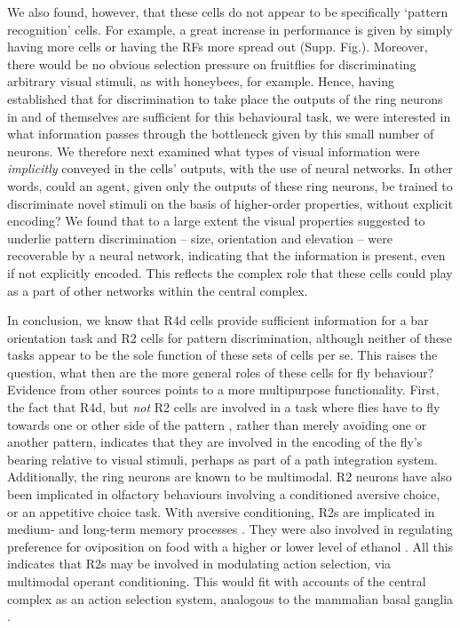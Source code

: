We also found, however, that these cells do not appear to be specifically `pattern recognition' cells.
For example, a great increase in performance is given by simply having more cells or having the RFs more spread out (Supp. Fig.).
Moreover, there would be no obvious selection pressure on fruitflies for discriminating arbitrary visual stimuli, as with honeybees, for example.
Hence, having established that for discrimination to take place the outputs of the ring neurons in and of themselves are sufficient for this behavioural task, we were interested in what information passes through the bottleneck given by this small number of neurons.
We therefore next examined what types of visual information were \emph{implicitly} conveyed in the cells' outputs, with the use of neural networks.
In other words, could an agent, given only the outputs of these ring neurons, be trained to discriminate novel stimuli on the basis of higher-order properties, without explicit encoding?
We found that to a large extent the visual properties suggested to underlie pattern discrimination -- size, orientation and elevation -- were recoverable by a neural network, indicating that the information is present, even if not explicitly encoded.
This reflects the complex role that these cells could play as a part of other networks within the central complex.

In conclusion, we know that R4d cells provide sufficient information for a bar orientation task and R2 cells for pattern discrimination, although neither of these tasks appear to be the sole function of these sets of cells per se.
This raises the question, what then are the more general roles of these cells for fly behaviour?
Evidence from other sources points to a more multipurpose functionality.
First, the fact that R4d, but \emph{not} R2 cells are involved in a task where flies have to fly towards one or other side of the pattern \cite{Guo2015}, rather than merely avoiding one or another pattern, indicates that they are involved in the encoding of the fly's bearing relative to visual stimuli, perhaps as part of a path integration system.
Additionally, the ring neurons are known to be multimodal.
R2 neurons have also been implicated in olfactory behaviours involving a conditioned aversive choice, or an appetitive choice task.
With aversive conditioning, R2s are implicated in medium- and long-term memory processes \cite{Zhang2013,Zhang2015}.
They were also involved in regulating preference for oviposition on food with a higher or lower level of ethanol \cite{Azanchi2013}.
All this indicates that R2s may be involved in modulating action selection, via multimodal operant conditioning.
This would fit with accounts of the central complex as an action selection system, analogous to the mammalian basal ganglia \cite{Strausfeld2013}.

